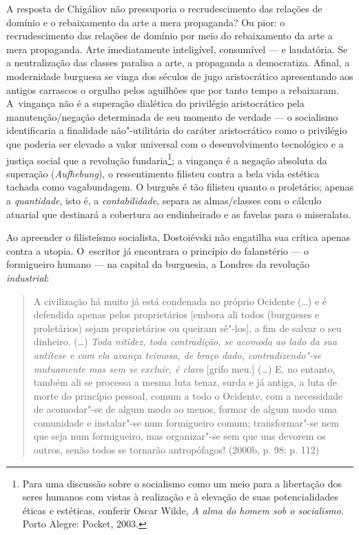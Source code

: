 A resposta de Chigáliov não pressuporia o recrudescimento das relações
de domínio e o rebaixamento da arte a mera propaganda? Ou pior: o
recrudescimento das relações de domínio por meio do rebaixamento da arte
a mera propaganda. Arte imediatamente inteligível, consumível --- e
laudatória. Se a neutralização das classes paralisa a arte, a propaganda
a democratiza. Afinal, a modernidade burguesa se vinga dos séculos de
jugo aristocrático apresentando aos antigos carrascos o orgulho pelos
aguilhões que por tanto tempo a rebaixaram. A~vingança não é a superação
dialética do privilégio aristocrático pela manutenção/negação
determinada de seu momento de verdade --- o socialismo identificaria a
finalidade não"-utilitária do caráter aristocrático como o privilégio que
poderia ser elevado a valor universal com o desenvolvimento tecnológico
e a justiça social que a revolução fundaria\footnote{Para uma discussão
  sobre o socialismo como um meio para a libertação dos seres humanos
  com vistas à realização e à elevação de suas potencialidades éticas e
  estéticas, conferir Oscar Wilde, \emph{A alma do homem sob o
  socialismo.} Porto Alegre:  Pocket, 2003.}; a vingança é a
negação absoluta da superação (\emph{Aufhebung}), o ressentimento
filisteu contra a bela vida estética tachada como vagabundagem. O
burguês é tão filisteu quanto o proletário; apenas a \emph{quantidade},
isto é, a \emph{contabilidade}, separa as almas/classes com o cálculo
atuarial que destinará a cobertura ao endinheirado e as favelas para o
miseralato.

Ao apreender o filisteísmo socialista, Dostoiévski não engatilha sua
crítica apenas contra a utopia. O~escritor já encontrara o princípio do
falanstério --- o formigueiro humano --- na capital da burguesia, a
Londres da revolução \emph{industrial}:

\begin{quote}
A civilização há muito já está condenada no próprio Ocidente (\ldots) e é
defendida apenas pelos proprietários {[}embora ali todos (burgueses e
proletários) sejam proprietários ou queiram sê"-los{]}, a fim de salvar o
seu dinheiro. (\ldots) \emph{Toda nitidez, toda contradição, se acomoda ao
lado da sua antítese e com ela avança teimosa, de braço dado,
contradizendo"-se mutuamente mas sem se excluir, é claro} {[}grifo
meu.{]} (\ldots) E, no entanto, também ali se processa a mesma luta tenaz,
surda e já antiga, a luta de morte do princípio pessoal, comum a todo o
Ocidente, com a necessidade de acomodar"-se de algum modo ao menos,
formar de algum modo uma comunidade e instalar"-se num formigueiro comum;
transformar"-se nem que seja num formigueiro, mas organizar"-se sem que
uns devorem os outros, senão todos se tornarão antropófagos! (2000b, p.
98; p. 112)
\end{quote}

